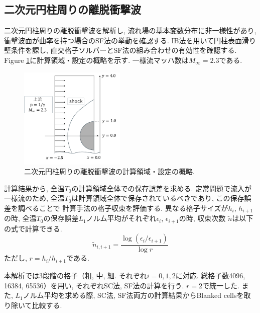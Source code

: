 \documentclass[a4j]{jarticle}
\begin{document}
\subsection{二次元円柱周りの離脱衝撃波}\label{subsec:2Dcirc}

二次元円柱周りの離脱衝撃波を解析し, 流れ場の基本変数分布に非一様性があり, 衝撃波面が曲率を持つ場合のSF法の挙動を確認する.
IB法を用いて円柱表面滑り壁条件を課し, 直交格子ソルバーとSF法の組み合わせの有効性を確認する.
Figure \ref{fig:2Dcolumnsitu}に計算領域・設定の概略を示す.
一様流マッハ数は$M_\infty=2.3$である.
\begin{figure}[h]
    \begin{center}
        \includegraphics[width=0.45\textwidth]{2Dcolumnsitu.pdf}
    \end{center}
    \caption{二次元円柱周りの離脱衝撃波の計算領域・設定の概略.}
    \label{fig:2Dcolumnsitu}
\end{figure}
計算結果から, 全温$T_0$の計算領域全体での保存誤差を求める.
定常問題で流入が一様流のため, 全温$T_0$は計算領域全体で保存されているべきであり, この保存誤差を調べることで
計算手法の格子収束を評価する. 
異なる格子サイズが$h_i$, $h_{i+1}$の時, 全温$T_0$の保存誤差$L_1$ノルム平均がそれぞれ$\epsilon_i$, $\epsilon_{i+1}$の時,
収束次数 $\tilde{n}$は以下の式で計算できる.
\begin{equation}
  \tilde{n}_{i,i+1} = \frac{\log (\epsilon_i/\epsilon_{i+1})}{\log r}
    \label{eq:order_of_conv}
\end{equation}
ただし, $r = h_i/h_{i+1}$である.

本解析では3段階の格子（粗, 中, 細. それぞれ$i=0,1,2$に対応. 総格子数4096, 16384, 65536）を用い, それぞれSC法, SF法の計算を行う.
$r=2$で統一した.
また, $L_1$ノルム平均を求める際, SC法, SF法両方の計算結果からBlanked cellsを取り除いて比較する.
\end{document}
